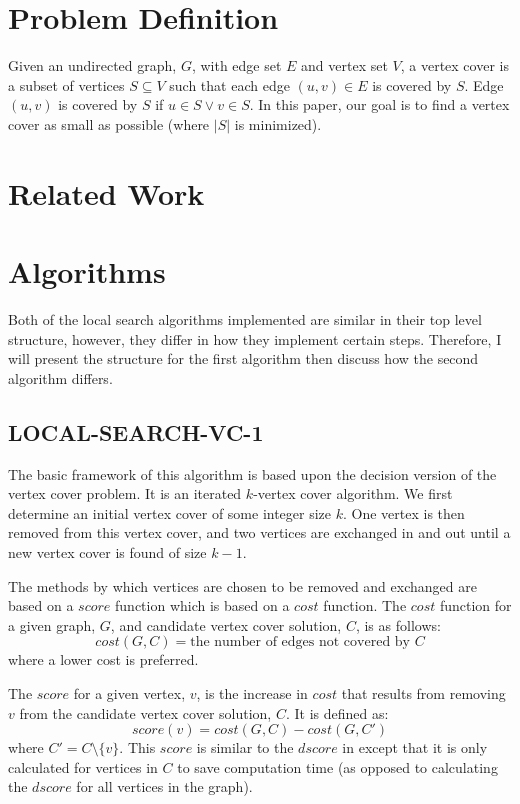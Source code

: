 \documentclass[sigconf]{acmart}
\begin{document}
\section{Problem Definition}
Given an undirected graph, $G$, with edge set $E$ and vertex set $V$, a vertex cover is a subset of vertices $S \subseteq V$ such that each edge $(u,v) \in E$ is covered by $S$. Edge $(u,v)$ is covered by $S$ if $u \in S \vee v \in S$. In this paper, our goal is to find a vertex cover as small as possible (where $|S|$ is minimized). 

\section{Related Work}


\section{Algorithms}
Both of the local search algorithms implemented are similar in their top level structure, however, they differ in how they implement certain steps. Therefore, I will present the structure for the first algorithm then discuss how the second algorithm differs.
\subsection{LOCAL-SEARCH-VC-1}
The basic framework of this algorithm is based upon the decision version of the vertex cover problem. It is an iterated $k$-vertex cover algorithm. We first determine an initial vertex cover of some integer size $k$. One vertex is then removed from this vertex cover, and two vertices are exchanged in and out until a new vertex cover is found of size $k - 1$.

The methods by which vertices are chosen to be removed and exchanged are based on a $score$ function which is based on a $cost$ function. The $cost$ function for a given graph, $G$, and candidate vertex cover solution, $C$, is as follows:
\begin{equation*}
	cost(G,C) = \text{the number of edges not covered by $C$}
\end{equation*}
where a lower cost is preferred.

The $score$ for a given vertex, $v$, is the increase in $cost$ that results from removing $v$ from the candidate vertex cover solution, $C$. It is defined as:
\begin{equation*}
	score(v) = cost(G,C) - cost(G,C')
\end{equation*}
where $C' = C \setminus \{v\}$. This $score$ is similar to the $dscore$ in \cite{cai2013numvc} except that it is only calculated for vertices in $C$ to save computation time (as opposed to calculating the $dscore$ for all vertices in the graph).
\end{document}
